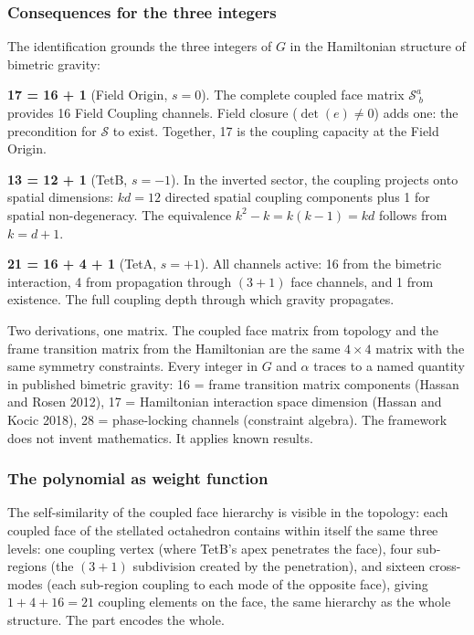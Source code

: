 \documentclass[aps,prd,preprint,superscriptaddress,showpacs,preprintnumbers,amsmath,amssymb,nofootinbib]{revtex4-2}
\begin{document}
\subsubsection*{Consequences for the three integers}

The identification grounds the three integers of $G$ in the Hamiltonian structure of bimetric gravity:

\textbf{17 = 16 + 1} (Field Origin, $s = 0$). The complete coupled face matrix $\mathcal{S}^a_{\;b}$ provides 16 Field Coupling channels. Field closure ($\det(e) \neq 0$) adds one: the precondition for $\mathcal{S}$ to exist. Together, 17 is the coupling capacity at the Field Origin.

\textbf{13 = 12 + 1} (TetB, $s = -1$). In the inverted sector, the coupling projects onto spatial dimensions: $kd = 12$ directed spatial coupling components plus 1 for spatial non-degeneracy. The equivalence $k^2 - k = k(k-1) = kd$ follows from $k = d + 1$.

\textbf{21 = 16 + 4 + 1} (TetA, $s = +1$). All channels active: 16 from the bimetric interaction, 4 from propagation through $(3{+}1)$ face channels, and 1 from existence. The full coupling depth through which gravity propagates.

Two derivations, one matrix. The coupled face matrix from topology and the frame transition matrix from the Hamiltonian are the same $4 \times 4$ matrix with the same symmetry constraints. Every integer in $G$ and $\alpha$ traces to a named quantity in published bimetric gravity: 16 = frame transition matrix components (Hassan and Rosen 2012), 17 = Hamiltonian interaction space dimension (Hassan and Kocic 2018), 28 = phase-locking channels (constraint algebra). The framework does not invent mathematics. It applies known results.

\subsubsection*{The polynomial as weight function}

The self-similarity of the coupled face hierarchy is visible in the topology: each coupled face of the stellated octahedron contains within itself the same three levels: one coupling vertex (where TetB's apex penetrates the face), four sub-regions (the $(3{+}1)$ subdivision created by the penetration), and sixteen cross-modes (each sub-region coupling to each mode of the opposite face), giving $1 + 4 + 16 = 21$ coupling elements on the face, the same hierarchy as the whole structure. The part encodes the whole.
\end{document}
